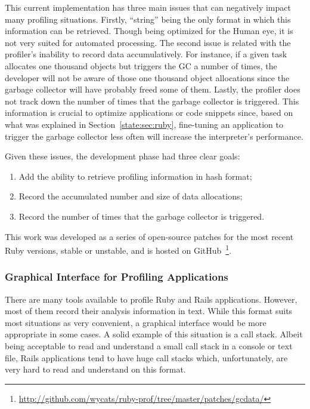 This current implementation has three main issues that can negatively impact many profiling situations. Firstly, ``string'' being the only format in which this information can be retrieved. Though being optimized for the Human eye, it is not very suited for automated processing. The second issue is related with the profiler's inability to record data accumulatively. For instance, if a given task allocates one thousand objects but triggers the GC a number of times, the developer will not be aware of those one thousand object allocations since the garbage collector will have probably freed some of them. Lastly, the profiler does not track down the number of times that the garbage collector is triggered. This information is crucial to optimize applications or code snippets since, based on what was explained in Section~\ref{state:sec:ruby}, fine-tuning an application to trigger the garbage collector less often will increase the interpreter's performance.

Given these issues, the development phase had three clear goals:
\begin{enumerate}
  \item Add the ability to retrieve profiling information in hash format;
  \item Record the accumulated number and size of data allocations;
  \item Record the number of times that the garbage collector is triggered.
\end{enumerate}

This work was developed as a series of open-source patches for the most recent Ruby versions, stable or unstable, and is hosted on GitHub~\footnote{\url{http://github.com/wycats/ruby-prof/tree/master/patches/gcdata/}}.

\subsubsection{Graphical Interface for Profiling Applications}
There are many tools available to profile Ruby and Rails applications. However, most of them record their analysis information in text. While this format suits most situations as very convenient, a graphical interface would be more appropriate in some cases. A solid example of this situation is a call stack. Albeit being acceptable to read and understand a small call stack in a console or text file, Rails applications tend to have huge call stacks which, unfortunately, are very hard to read and understand on this format.

